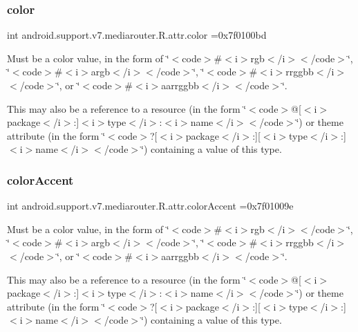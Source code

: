 \subsubsection{\texorpdfstring{color}{color}}
{\footnotesize\ttfamily int android.\+support.\+v7.\+mediarouter.\+R.\+attr.\+color =0x7f0100bd\hspace{0.3cm}{\ttfamily [static]}}

Must be a color value, in the form of \char`\"{}$<$code$>$\#$<$i$>$rgb$<$/i$>$$<$/code$>$\char`\"{}, \char`\"{}$<$code$>$\#$<$i$>$argb$<$/i$>$$<$/code$>$\char`\"{}, \char`\"{}$<$code$>$\#$<$i$>$rrggbb$<$/i$>$$<$/code$>$\char`\"{}, or \char`\"{}$<$code$>$\#$<$i$>$aarrggbb$<$/i$>$$<$/code$>$\char`\"{}. 

This may also be a reference to a resource (in the form \char`\"{}$<$code$>$@\mbox{[}$<$i$>$package$<$/i$>$\+:\mbox{]}$<$i$>$type$<$/i$>$\+:$<$i$>$name$<$/i$>$$<$/code$>$\char`\"{}) or theme attribute (in the form \char`\"{}$<$code$>$?\mbox{[}$<$i$>$package$<$/i$>$\+:\mbox{]}\mbox{[}$<$i$>$type$<$/i$>$\+:\mbox{]}$<$i$>$name$<$/i$>$$<$/code$>$\char`\"{}) containing a value of this type. \mbox{\label{classandroid_1_1support_1_1v7_1_1mediarouter_1_1R_1_1attr_a819d6b80d88b055311583857808c3cad}} 
\subsubsection{\texorpdfstring{color\+Accent}{colorAccent}}
{\footnotesize\ttfamily int android.\+support.\+v7.\+mediarouter.\+R.\+attr.\+color\+Accent =0x7f01009e\hspace{0.3cm}{\ttfamily [static]}}

Must be a color value, in the form of \char`\"{}$<$code$>$\#$<$i$>$rgb$<$/i$>$$<$/code$>$\char`\"{}, \char`\"{}$<$code$>$\#$<$i$>$argb$<$/i$>$$<$/code$>$\char`\"{}, \char`\"{}$<$code$>$\#$<$i$>$rrggbb$<$/i$>$$<$/code$>$\char`\"{}, or \char`\"{}$<$code$>$\#$<$i$>$aarrggbb$<$/i$>$$<$/code$>$\char`\"{}. 

This may also be a reference to a resource (in the form \char`\"{}$<$code$>$@\mbox{[}$<$i$>$package$<$/i$>$\+:\mbox{]}$<$i$>$type$<$/i$>$\+:$<$i$>$name$<$/i$>$$<$/code$>$\char`\"{}) or theme attribute (in the form \char`\"{}$<$code$>$?\mbox{[}$<$i$>$package$<$/i$>$\+:\mbox{]}\mbox{[}$<$i$>$type$<$/i$>$\+:\mbox{]}$<$i$>$name$<$/i$>$$<$/code$>$\char`\"{}) containing a value of this type. \mbox{\label{classandroid_1_1support_1_1v7_1_1mediarouter_1_1R_1_1attr_a850272e1d6fbbcfc7e8ac38e3a828cdc}} 
